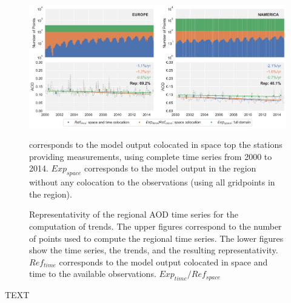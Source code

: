 \documentclass[journal abbreviation, manuscript]{copernicus}
\begin{document}
\begin{figure}[t]
 \includegraphics[width=16cm]{../scripts/figs/representativity-od550aer.png}
 \caption{Representativity of the regional AOD time series for the computation of trends. The upper figures correspond to the number of points used to compute the regional time series. The lower figures show the time series, the trends, and the resulting representativity. $Ref_{time}$ corresponds to the model output colocated in space and time to the available observations. $Exp_{time}/Ref_{space}$} corresponds to the model output colocated in space top the stations providing measurements, using complete time series from 2000 to 2014. $Exp_{space}$ corresponds to the model output in the region without any colocation to the observations (using all gridpoints in the region).
 \label{fig:representativity}
\end{figure}

\appendixfigures  %

\appendixtables   %







\begin{acknowledgements}
 TEXT
\end{acknowledgements}





\end{document}

